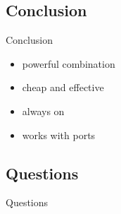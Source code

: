 \documentclass[14pt,aspectratio=169]{beamer}
\begin{document}
\subsection{Conclusion}
\begin{frame}{Conclusion}
\begin{itemize}
  \item powerful combination
  \item cheap and effective
  \item always on
  \item works with ports
\end{itemize}
\end{frame}

\subsection{Questions}
\begin{frame}{Questions}
\begin{center}
\end{center}
\end{frame}
\end{document}
